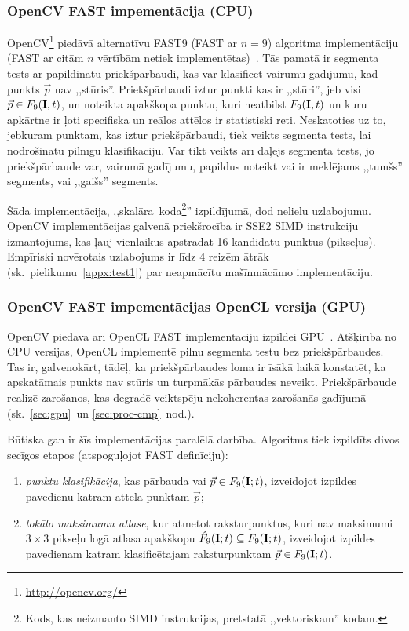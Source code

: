 \subsubsection{OpenCV FAST impementācija (CPU)} \label{sec:fast-ocv}
OpenCV\footnote{\url{http://opencv.org/}} piedāvā alternatīvu FAST9 
(FAST ar $n=9$) algoritma
implementāciju (FAST ar citām $n$ vērtībām netiek implementētas)~\cite{OpenCV-src}.
Tās pamatā ir segmenta tests ar papildinātu
priekšpārbaudi\cite{Rosten-tracking}\cite{FAST}, kas var klasificēt vairumu
gadījumu, kad punkts $\vec{p}$ nav ,,stūris''. Priekšpārbaudi iztur
punkti kas ir ,,stūri'', jeb visi $\vec{p} \in F_9(\mathbf{I}, t)$,
un noteikta apakškopa punktu, kuri neatbilst $F_9(\mathbf{I}, t)$ un kuru
apkārtne ir ļoti specifiska un reālos attēlos ir statistiski reti.
Neskatoties
uz to, jebkuram punktam, kas iztur priekšpārbaudi, tiek veikts segmenta
tests, lai nodrošinātu pilnīgu klasifikāciju.
Var tikt veikts arī daļējs segmenta tests, jo priekšpārbaude var,
vairumā gadījumu, papildus noteikt vai ir meklējams ,,tumšs'' segments, vai
,,gaišs'' segments.

Šāda implementācija, ,,skalāra~koda\footnote{Kods, kas neizmanto SIMD
	instrukcijas, pretstatā ,,vektoriskam'' kodam.}''
izpildījumā, dod nelielu uzlabojumu. OpenCV implementācijas galvenā
priekšrocība ir SSE2 SIMD instrukciju izmantojums, kas ļauj vienlaikus
apstrādāt 16 kandidātu punktus (pikseļus). Empīriski novērotais
uzlabojums ir līdz 4 reizēm ātrāk (sk.~pielikumu~\ref{appx:test1})
par neapmācītu mašīnmācāmo implementāciju.

\subsubsection{OpenCV FAST impementācijas OpenCL versija (GPU)} \label{sec:fast-ocv-cl}
OpenCV piedāvā arī OpenCL FAST implementāciju izpildei GPU~\cite{OpenCV-src}.
Atšķirībā no CPU versijas, OpenCL implementē pilnu segmenta testu bez
priekšpārbaudes. Tas ir, galvenokārt, tādēļ, ka priekšpārbaudes loma ir
īsākā laikā konstatēt, ka apskatāmais punkts nav stūris un turpmākās pārbaudes
neveikt. Priekšpārbaude realizē zarošanos, kas degradē veiktspēju
nekoherentas zarošanās gadījumā (sk.~\ref{sec:gpu}~un \ref{sec:proc-cmp}~nod.).

Būtiska gan ir šīs implementācijas paralēlā darbība. Algoritms tiek
izpildīts divos secīgos etapos (atspoguļojot FAST definīciju):
\begin{enumerate}
	\item \emph{punktu klasifikācija}, kas pārbauda vai
		$\vec{p} \in F_9(\mathbf{I}; t)$, izveidojot izpildes pavedienu katram
		attēla punktam $\vec{p}$;
	\item \emph{lokālo maksimumu atlase}, kur atmetot raksturpunktus,
		kuri nav maksimumi $3 \times 3$ pikseļu logā atlasa apakškopu
		$\hat{F_9}(\mathbf{I}; t) \subseteq F_9(\mathbf{I}; t)$, izveidojot
		izpildes pavedienam katram klasificētajam raksturpunktam
		$\vec{p} \in F_9(\mathbf{I}; t)$.
\end{enumerate}

